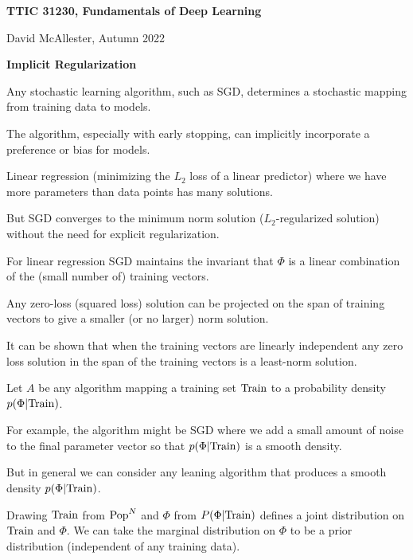 





{\Huge


\centerline{\bf TTIC 31230, Fundamentals of Deep Learning}
\bigskip
\centerline{David McAllester, Autumn 2022}

\vfill
\centerline{\bf Implicit Regularization}
\vfill
\vfill


Any stochastic learning algorithm, such as SGD, determines a stochastic mapping from training data to models.

\vfill
The algorithm, especially with early stopping, can implicitly incorporate a preference or bias for models.


Linear regression (minimizing the $L_2$ loss of a linear predictor) where we have more parameters than data points
has many solutions.

\vfill
But SGD converges to the minimum norm solution ($L_2$-regularized solution) without the need for explicit regularization.


For linear regression SGD maintains the invariant that $\Phi$ is a linear combination of the (small number of) training vectors.

\vfill
Any zero-loss (squared loss) solution can be projected on the span of training vectors to give a smaller (or no larger) norm solution.

\vfill
It can be shown that when the training vectors are linearly independent any zero loss solution in the span of the training vectors is a least-norm solution.


Let $A$ be any algorithm mapping a training set $\mathrm{Train}$ to a probability density $p(\Phi|\mathrm{Train})$.

\vfill
For example, the algorithm might be SGD where we add a small amount of noise to the final parameter vector so that $p(\Phi|\mathrm{Train})$ is a smooth density.

\vfill
But in general we can consider any leaning algorithm that produces a smooth density $p(\Phi|\mathrm{Train})$.


Drawing $\mathrm{Train}$ from $\mathrm{Pop}^N$ and $\Phi$ from $P(\Phi|\mathrm{Train})$ defines a joint distribution on $\mathrm{Train}$ and $\Phi$.  We can take the marginal distribution on $\Phi$
to be a prior distribution (independent of any training data).

}
